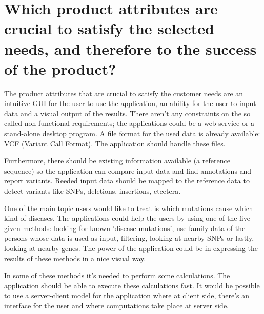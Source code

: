 \section{Which product attributes are crucial to satisfy the selected needs, and therefore to the success of the product?}
The product attributes that are crucial to satisfy the customer needs are an intuitive GUI for the user to use the application, an ability for the user to input data and a visual output of the results. There aren't any constraints on the so called non functional requirements; the applications could be a web service or a stand-alone desktop program. A file format for the used data is already available: VCF (Variant Call Format). The application should handle these files.

Furthermore, there should be existing information available (a reference sequence) so the application can compare input data and find annotations and report variants. Reeded input data should be mapped to the reference data to detect variants like SNPs, deletions, insertions, etcetera.

One of the main topic users would like to treat is which mutations cause which kind of diseases. The applications could help the users by using one of the five given methods: looking for known 'disease mutations', use family data of the persons whose data is used as input, filtering, looking at nearby SNPs or lastly, looking at nearby genes. The power of the application could be in expressing the results of these methods in a nice visual way.

In some of these methods it's needed to perform some calculations. The application should be able to execute these calculations fast. It would be possible to use a server-client model for the application where at client side, there's an interface for the user and where computations take place at server side.